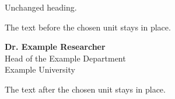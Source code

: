 \documentclass[11pt]{article}
\begin{document}
Unchanged heading.

The text before the chosen unit stays in place.

\noindent
\textbf{Dr. Example Researcher}\\[2pt]
Head of the Example Department\\[2pt]
Example University


\par\vspace{25mm}
The text after the chosen unit stays in place.
\end{document}
